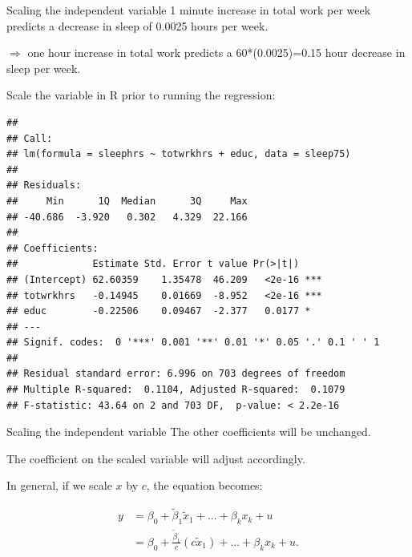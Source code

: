 \documentclass[
  ignorenonframetext,
]{beamer}
\newenvironment{Shaded}{\begin{snugshade}}{\end{snugshade}}
\newcommand{\DecValTok}[1]{\textcolor[rgb]{0.00,0.00,0.81}{#1}}
\newcommand{\FunctionTok}[1]{\textcolor[rgb]{0.00,0.00,0.00}{#1}}
\newcommand{\NormalTok}[1]{#1}
\newcommand{\OtherTok}[1]{\textcolor[rgb]{0.56,0.35,0.01}{#1}}
\newcommand{\SpecialCharTok}[1]{\textcolor[rgb]{0.00,0.00,0.00}{#1}}
\begin{document}
\begin{frame}[fragile]{Scaling the independent variable}
\protect\hypertarget{scaling-the-independent-variable}{}
1 minute increase in total work per week predicts a decrease in sleep of
0.0025 hours per week.

\(\Rightarrow\) one hour increase in total work predicts a
60*(0.0025)=0.15 hour decrease in sleep per week.

Scale the variable in R prior to running the regression: \tiny

\begin{Shaded}
\end{Shaded}

\begin{verbatim}
## 
## Call:
## lm(formula = sleephrs ~ totwrkhrs + educ, data = sleep75)
## 
## Residuals:
##     Min      1Q  Median      3Q     Max 
## -40.686  -3.920   0.302   4.329  22.166 
## 
## Coefficients:
##             Estimate Std. Error t value Pr(>|t|)    
## (Intercept) 62.60359    1.35478  46.209   <2e-16 ***
## totwrkhrs   -0.14945    0.01669  -8.952   <2e-16 ***
## educ        -0.22506    0.09467  -2.377   0.0177 *  
## ---
## Signif. codes:  0 '***' 0.001 '**' 0.01 '*' 0.05 '.' 0.1 ' ' 1
## 
## Residual standard error: 6.996 on 703 degrees of freedom
## Multiple R-squared:  0.1104, Adjusted R-squared:  0.1079 
## F-statistic: 43.64 on 2 and 703 DF,  p-value: < 2.2e-16
\end{verbatim}
\end{frame}

\begin{frame}{Scaling the independent variable}
\protect\hypertarget{scaling-the-independent-variable-1}{}
The other coefficients will be unchanged.

The coefficient on the scaled variable will adjust accordingly.

In general, if we scale \(x\) by \(c\), the equation becomes:

\[
\begin{aligned}
y&= \beta_0+\tilde{\beta}_1\tilde{x}_1+...+\beta_kx_k+u\\
&= \beta_0+\frac{\tilde{\beta}_1}{c}(c\tilde{x}_1)+...+\beta_kx_k+u.
\end{aligned}
\]
\end{frame}
\end{document}
